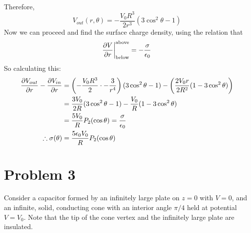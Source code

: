 \documentclass[10pt]{article}
\begin{document}
\begin{solution}
\begin{align*}
		\end{align*}
		Therefore, 
		\[
			V_{out}(r, \theta) = -\frac{V_0R^3}{2r^3}(3 \cos^2 \theta -1)
		\] 
		Now we can proceed and find the surface charge density, using the relation that 
		\[ 
			\pdv{V}{r}\bigg|_{\text{below}}^{\text{above}} = -\frac{\sigma}{\epsilon_0}
		\] 	
		So calculating this:
		\begin{align*}
			\pdv{V_{out}}{r} - \pdv{V_{in}}{r} &= \left( -\frac{V_0R^3}{2} \cdot -\frac{3}{r^4} \right) 
			(3\cos^2 \theta - 1) - \left(\frac{2V_0r}{2R^2}(1 - 3\cos^2 \theta)\right)\\
			&= \frac{3V_0}{2R} (3\cos^2 \theta - 1) - \frac{V_0}{R}(1 - 3\cos^2 \theta)\\
			&= \frac{5V_0}{R}P_2(\cos \theta) = \frac{\sigma}{\epsilon_0} \\
			\therefore \sigma(\theta) &= \frac{5\epsilon_0V_0}{R}P_2(\cos \theta)
		\end{align*}
	\end{solution}
	\pagebreak

	\section*{Problem 3}
	Consider a capacitor formed by an infinitely large plate on $z = 0$ with $V = 0$, and an infinite, solid, 
	conducting cone with an interior angle $\pi/4$ held at potential $V = V_0$. Note that the tip of the cone 
	vertex and the infinitely large plate are insulated. 
	
\end{document}
